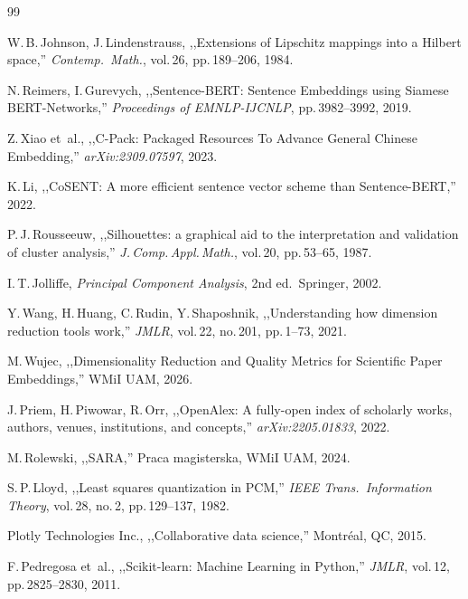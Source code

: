 \documentclass[a4paper,11pt]{article}
\begin{document}
\begin{thebibliography}{99}

W.\,B.\,Johnson, J.\,Lindenstrauss,
,,Extensions of Lipschitz mappings into a Hilbert space,''
\emph{Contemp.\ Math.}, vol.\,26, pp.\,189--206, 1984.

N.\,Reimers, I.\,Gurevych,
,,Sentence-BERT: Sentence Embeddings using Siamese BERT-Networks,''
\emph{Proceedings of EMNLP-IJCNLP}, pp.\,3982--3992, 2019.

Z.\,Xiao et~al.,
,,C-Pack: Packaged Resources To Advance General Chinese Embedding,''
\emph{arXiv:2309.07597}, 2023.

K.\,Li,
,,CoSENT: A more efficient sentence vector scheme than Sentence-BERT,'' 2022.

P.\,J.\,Rousseeuw,
,,Silhouettes: a graphical aid to the interpretation and validation of cluster analysis,''
\emph{J.\,Comp.\,Appl.\,Math.}, vol.\,20, pp.\,53--65, 1987.

I.\,T.\,Jolliffe,
\emph{Principal Component Analysis}, 2nd ed.\ Springer, 2002.

Y.\,Wang, H.\,Huang, C.\,Rudin, Y.\,Shaposhnik,
,,Understanding how dimension reduction tools work,''
\emph{JMLR}, vol.\,22, no.\,201, pp.\,1--73, 2021.

M.\,Wujec,
,,Dimensionality Reduction and Quality Metrics for Scientific Paper Embeddings,''
WMiI UAM, 2026.

J.\,Priem, H.\,Piwowar, R.\,Orr,
,,OpenAlex: A fully-open index of scholarly works, authors, venues, institutions, and concepts,''
\emph{arXiv:2205.01833}, 2022.

M.\,Rolewski,
,,SARA,''
Praca magisterska, WMiI UAM, 2024.

S.\,P.\,Lloyd,
,,Least squares quantization in PCM,''
\emph{IEEE Trans.\ Information Theory}, vol.\,28, no.\,2, pp.\,129--137, 1982.

Plotly Technologies Inc.,
,,Collaborative data science,'' Montréal, QC, 2015.

F.\,Pedregosa et~al.,
,,Scikit-learn: Machine Learning in Python,''
\emph{JMLR}, vol.\,12, pp.\,2825--2830, 2011.

\end{thebibliography}
\end{document}
